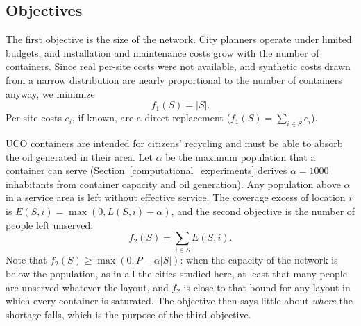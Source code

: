 \subsection{Objectives}
The first objective is the size of the network. City planners operate under limited budgets, and installation and maintenance costs grow with the number of containers. Since real per-site costs were not available, and synthetic costs drawn from a narrow distribution are nearly proportional to the number of containers anyway, we minimize
\begin{equation}
    f_1(S) = |S| .
\end{equation}
Per-site costs $c_i$, if known, are a direct replacement ($f_1(S) = \sum_{i \in S} c_i$).

UCO containers are intended for citizens' recycling and must be able to absorb the oil generated in their area. Let $\alpha$ be the maximum population that a container can serve (Section~\ref{computational_experiments} derives $\alpha = 1000$ inhabitants from container capacity and oil generation). Any population above $\alpha$ in a service area is left without effective service. The coverage excess of location $i$ is $E(S, i) = \max(0, L(S,i) - \alpha)$, and the second objective is the number of people left unserved:
\begin{equation}
    f_2(S) = \sum_{i \in S} E(S, i) .
\end{equation}
Note that $f_2(S) \geq \max(0, P - \alpha |S|)$: when the capacity of the network is below the population, as in all the cities studied here, at least that many people are unserved whatever the layout, and $f_2$ is close to that bound for any layout in which every container is saturated. The objective then says little about \emph{where} the shortage falls, which is the purpose of the third objective.

